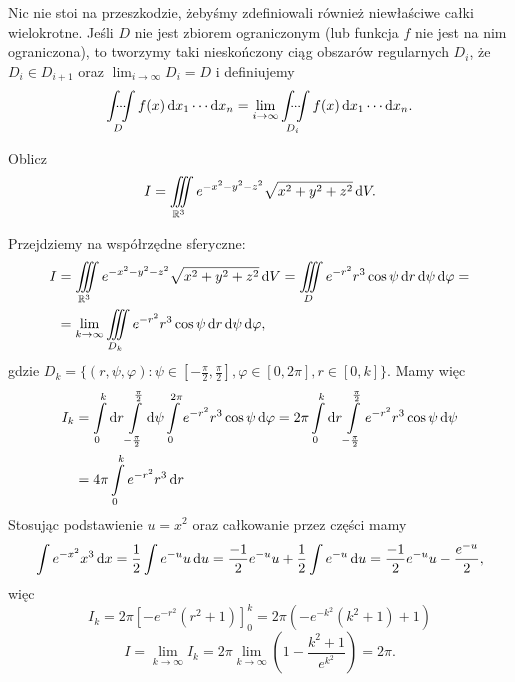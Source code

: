 Nic nie stoi na przeszkodzie, żebyśmy zdefiniowali również niewłaściwe całki wielokrotne. Jeśli $D$ nie jest zbiorem ograniczonym (lub funkcja $f$ nie jest na nim ograniczona), to tworzymy taki nieskończony ciąg obszarów regularnych $D_i$, że $D_i \in D_{i+1}$ oraz $\lim_{i\to\infty} D_i = D$ i definiujemy
\[ \idotsint\limits_D f(x) \operatorname{d}\!{x}_1 \cdots \operatorname{d}\!{x}_n = \lim_{i\to\infty} \idotsint\limits_{D_i} f(x) \operatorname{d}\!{x}_1 \cdots \operatorname{d}\!{x}_n. \]

\begin{example}
    Oblicz
    \[ I = \iiint\limits_{\mathbb R^3} e^{-x^2 - y^2 - z^2}\sqrt{x^2 + y^2 + z^2} \operatorname{d}\!{V}. \]
\end{example}
\begin{solution}
    Przejdziemy na współrzędne sferyczne:
    \begin{align*}
        I &= \iiint\limits_{\mathbb R^3} e^{-x^2 - y^2 - z^2}\sqrt{x^2 + y^2 + z^2} \operatorname{d}\!{V} = \iiint\limits_D e^{-r^2}r^3\cos\psi \operatorname{d}\!{r} \operatorname{d}\!{\psi} \operatorname{d}\!{\varphi} = \\
        &= \lim_{k\to\infty} \iiint\limits_{D_k} e^{-r^2}r^3\cos\psi \operatorname{d}\!{r} \operatorname{d}\!{\psi} \operatorname{d}\!{\varphi},
    \end{align*}
    gdzie $D_k = \{(r, \psi, \varphi) : \psi \in [-\frac{\pi}{2}, \frac{\pi}{2}], \varphi \in [0, 2\pi], r \in [0, k]\}$. Mamy więc
    \begin{align*}
        I_k &= \int\limits_0^k \operatorname{d}\!{r} \int\limits_{-\frac{\pi}{2}}^{\frac{\pi}{2}} \operatorname{d}\!{\psi} \int\limits_0^{2\pi} e^{-r^2}r^3\cos\psi \operatorname{d}\!{\varphi} = 2\pi \int\limits_0^k \operatorname{d}\!{r} \int\limits_{-\frac{\pi}{2}}^{\frac{\pi}{2}} e^{-r^2}r^3\cos\psi \operatorname{d}\!{\psi} \\
        &= 4\pi \int\limits_0^k e^{-r^2}r^3 \operatorname{d}\!{r}
    \end{align*}
    Stosując podstawienie $u = x^2$ oraz całkowanie przez części mamy
    \[ \int e^{-x^2}x^3 \operatorname{d}\!{x} = \frac{1}{2} \int e^{-u} u \operatorname{d}\!{u} = \frac{-1}{2}e^{-u} u + \frac{1}{2}\int e^{-u} \operatorname{d}\!{u} = \frac{-1}{2}e^{-u} u - \frac{e^{-u}}{2}, \]
    więc
    \[ I_k = 2\pi \left[-e^{-r^2}(r^2 + 1)\right]_0^k = 2\pi \left(-e^{-k^2}(k^2 + 1) + 1\right) \]
    \[ I = \lim_{k\to\infty} I_k = 2\pi \lim_{k\to\infty} \left(1 - \frac{k^2 + 1}{e^{k^2}}\right) = 2\pi. \]
\end{solution}